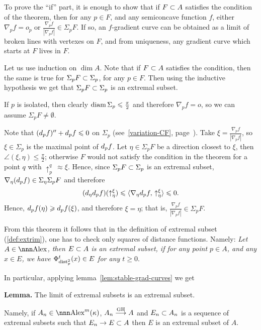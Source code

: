\documentclass{article}
\begin{document}
To prove the ``if'' part, it is enough to show that if $F\subset A$ satisfies the condition of the theorem,
then for any $p\in F$, and any semiconcave function $f$, either $\nabla_p f=o_p$ or 
$\tfrac{\nabla_p f}{|\nabla_p f|}\in \Sigma_p F$.
If so, an $f$-gradient curve
can be obtained as a limit of broken lines with vertexes on $F$, and from
uniqueness, any gradient curve which starts at $F$ lives in $F$.

Let us use induction on $\dim A$. 
Note that if $F\subset A$ satisfies the condition,
then the same is true for $\Sigma_p F\subset\Sigma_p$, for any $p\in F$.
Then using the inductive hypothesis we get that $\Sigma_p F\subset \Sigma_p$ is an extremal subset.

If $p$ is isolated, then clearly $\operatorname{diam} \Sigma_p\leqslant \tfrac\pi2$ and therefore $\nabla_p
f=o$, so we can assume $\Sigma_p F\not=\emptyset$. 

Note that $(d_p f)''+d_p f\leqslant 0$ on $\Sigma_p$ 
(see~\ref{variation-CF}, page~\pageref{variation-CF}).
Take $\xi=\tfrac{\nabla_p f}{|\nabla_p f|}$, so 
$\xi\in \Sigma_p$ is the maximal point of $d_p f$.
Let $\eta\in \Sigma_p F$ be a direction closest  to $\xi$, then
$\angle(\xi,\eta)\le \tfrac\pi2$; otherwise $F$ would not satisfy the condition in the theorem for a point $q$ with $\uparrow_p^q\,\approx\xi$.
Hence, since $\Sigma_p F\subset \Sigma_p$ is an extremal subset, $\nabla_\eta(d_p f)\in \Sigma_\eta \Sigma_p F$ and
therefore 
$$(d_\eta d_p f)(\uparrow_\eta^\xi)\leqslant\langle\nabla_\eta d_p
f,\,\uparrow_\eta^\xi\rangle\leqslant0.$$
Hence, $d_p f(\eta)\geqslant d_p f(\xi)$, and therefore $\xi=\eta$;
that is,  $\tfrac{\nabla_p f}{|\nabla_p f|}\in \Sigma_p F$. 
\qeds

From this theorem it follows that in the definition of extremal subset (\ref{def:extrim}),
one has to check only squares of distance functions. 
Namely:
\textit{Let $A\in \Alex$, then $E\subset A$ is an extremal subset, if for any point $p\in A$, and any $x\in E$, we
have $\Phi_{\operatorname{dist}_p^2}^t(x)\in E$ for any $t\ge 0$}.

In particular, applying lemma~\ref{lem:stable-grad-curves} we get

\begin{thm}{\bf Lemma.}
\label{lem:limit-extr} The limit of extremal subsets is an extremal subset. 

Namely, if $A_n\in\Alex^m(\kappa)$, $A_n\GHto A$  and $E_n\subset A_n$ is a sequence
of extremal subsets such that $E_n\to E\subset A$ then $E$ is an extremal subset of
$A$. 
\end{thm}
\end{document}
